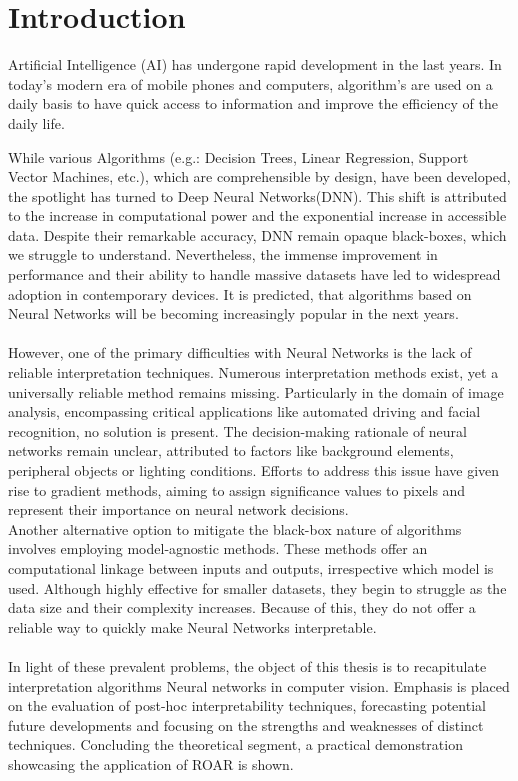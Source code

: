 
\chapter{Introduction}

Artificial Intelligence (AI) has undergone rapid development in the last years. In today's modern era of mobile phones and computers, algorithm's are used on a daily basis to have quick access to information and improve the efficiency of the daily life.

While various Algorithms (e.g.: Decision Trees, Linear Regression, Support Vector Machines, etc.), which are comprehensible by design, have been developed, the spotlight has turned to Deep Neural Networks(DNN). This shift is attributed to the increase in computational power and the exponential increase in accessible data. Despite their remarkable accuracy, DNN remain opaque black-boxes, which we  struggle to understand. Nevertheless, the immense improvement in performance and their ability to handle massive datasets have led to widespread adoption in contemporary devices. It is predicted, that algorithms based on Neural Networks will be becoming increasingly popular in the next years.
\\\\
However, one of the primary difficulties with Neural Networks is the lack of reliable interpretation techniques. Numerous interpretation methods exist, yet a universally reliable method remains missing. Particularly in the domain of image analysis, encompassing critical applications like automated driving and facial recognition, no solution is present. The decision-making rationale of neural networks remain unclear, attributed to factors like background elements, peripheral objects or lighting conditions.
Efforts to address this issue have given rise to gradient methods, aiming to assign significance values to pixels and represent their importance on neural network decisions.
\\
Another alternative option to mitigate the black-box nature of  algorithms involves employing model-agnostic methods. These methods offer an computational linkage between inputs and outputs, irrespective which model is used. Although highly effective for smaller datasets, they begin to struggle as the data size and their complexity increases. Because of this, they do not offer a reliable way to quickly make Neural Networks interpretable.
\\\\
In light of these prevalent problems, the object of this thesis is to recapitulate interpretation algorithms Neural networks in computer vision.  Emphasis is placed on the evaluation of post-hoc interpretability techniques, forecasting potential future developments and focusing on the strengths and weaknesses of distinct  techniques. Concluding the theoretical segment, a practical demonstration showcasing the application of ROAR is shown. 






